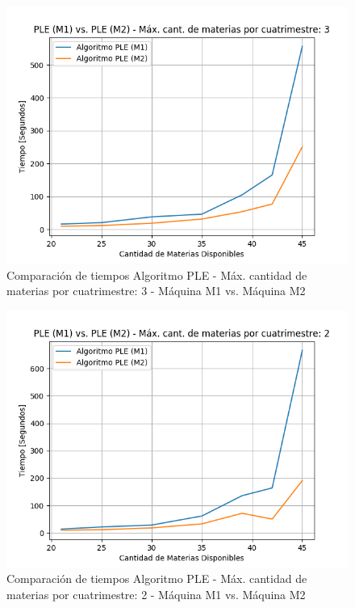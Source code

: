 \documentclass[a4paper]{article}
\begin{document}
\begin{figure}[H]
\centering
\includegraphics[scale=0.65]{Imagenes/m1_vs_m2_max_mat_3.png}\par
\caption{Comparación de tiempos Algoritmo PLE - Máx. cantidad de materias por cuatrimestre: 3 - Máquina M1 vs. Máquina M2}
\end{figure}

\begin{figure}[H]
\centering
\includegraphics[scale=0.65]{Imagenes/m1_vs_m2_max_mat_2.png}\par
\caption{Comparación de tiempos Algoritmo PLE - Máx. cantidad de materias por cuatrimestre: 2 - Máquina M1 vs. Máquina M2}
\end{figure}
\end{document}
